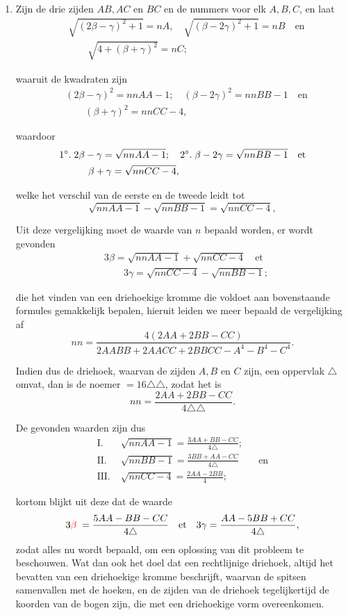 \documentclass[10pt,a4paper]{article}
\newcommand{\switchenum}{\setcounter{enumi}{\arabic{enumi}-1}\switchcolumn}
\begin{document}
\begin{paracol}{2}
\begin{enumerate}[topsep=1px]
		\switchenum
		\item Zijn de drie zijden $AB, AC$ en $BC$ en de nummers voor elk $A, B, C$, en laat
		\begin{align*}
			&\sqrt{(2\beta - \gamma)^2+1} = nA, \quad \sqrt{(\beta-2\gamma)^2+1} = nB \quad \text{en}\\
			&\qquad \sqrt{4+(\beta + \gamma)^2}= nC;
		\end{align*}
		\par waaruit de kwadraten zijn
		\begin{align*}
			&(2\beta- \gamma)^2 = nnAA - 1; \quad (\beta-2\gamma )^2= nnBB-1\quad \text{en}\\
			&\qquad (\beta+\gamma)^2= nnCC-4,
		\end{align*}
		\par waardoor
		\begin{align*}
			&\text{1}\degree.\; 2\beta - \gamma = \sqrt{nnAA-1}; \quad \text{2}\degree.\; \beta - 2\gamma = \sqrt{nnBB-1}\quad \text{et}\\
			&\qquad \quad \beta + \gamma = \sqrt{nnCC-4},
		\end{align*}
		\par welke het verschil van de eerste en de tweede leidt tot
		\[
			\sqrt{nnAA-1}-\sqrt{nnBB-1} = \sqrt{nnCC-4},
		\]
		\par Uit deze vergelijking moet de waarde van $n$ bepaald worden, er wordt gevonden
		\begin{align*}
			&3\beta = \sqrt{nnAA-1}+\sqrt{nnCC-4} \quad \text{et}\\
			&\qquad 3\gamma = \sqrt{nnCC-4}-\sqrt{nnBB-1};
		\end{align*}
		\par die het vinden van een driehoekige kromme die voldoet aan bovenstaande formules gemakkelijk bepalen, hieruit leiden we meer bepaald de vergelijking af
		\[
			nn = \frac{4(2AA+2BB-CC)}{2AABB+2AACC+2BBCC-A^4-B^4-C^4}.
		\]
		\par Indien dus de driehoek, waarvan de zijden $A, B$ en $C$ zijn, een oppervlak $\triangle$ omvat, dan is de noemer $=16\triangle \triangle$, zodat het is 
		\[
			nn=\frac{2AA+2BB-CC}{4 \triangle \triangle}.
		\]
		\par De gevonden waarden zijn dus
		\begin{align*}
			\text{I}. \;& \sqrt{nnAA-1} = \frac{3AA+BB-CC}{4\triangle};\\
			\text{II}. \; & \sqrt{nnBB-1} = \frac{3BB+AA-CC}{4\triangle} \qquad \text{en}\\
			\text{III}. \;& \sqrt{nnCC-4} = \frac{2AA-2BB}{4};
		\end{align*}
		\par kortom blijkt uit deze dat de waarde
		\[
			3{\color{red}\beta}\; = \frac{5AA-BB-CC}{4\triangle} \quad \text{et} \quad 3\gamma = \frac{AA-5BB+CC}{4\triangle},
		\]
		zodat alles nu wordt bepaald, om een oplossing van dit probleem te beschouwen. Wat dan ook het doel dat een rechtlijnige driehoek, altijd het bevatten van een driehoekige kromme beschrijft, waarvan de spitsen samenvallen met de hoeken, en de zijden van de driehoek tegelijkertijd de koorden van de bogen zijn, die met een driehoekige vorm overeenkomen.
		

\end{enumerate}
\end{paracol}
\end{document}
